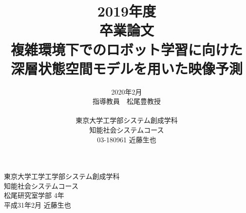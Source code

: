 \documentclass[a4paper,12pt,oneside,openany,dvipdfmx]{jsbook}
\title{
    2019年度\\
    卒業論文\\
    複雑環境下でのロボット学習に向けた\\
    深層状態空間モデルを用いた映像予測
}
\author{
    2020年2月\\
    指導教員　松尾豊教授\\
    \\
    東京大学工学部システム創成学科\\
    知能社会システムコース\\
    03-180961 近藤生也
}
\date{}
\begin{document}
\maketitle
\pagestyle{plain}
\setlength{\baselineskip}{22truept}
\frontmatter

\setcounter{tocdepth}{2}
\tableofcontents
\listoffigures
\listoftables
\mainmatter









\begin{flushright}
東京大学工学工学部システム創成学科\\
知能社会システムコース\\
松尾研究室学部 4年\\
平成31年2月 近藤生也\\
\end{flushright}

\end{document}
